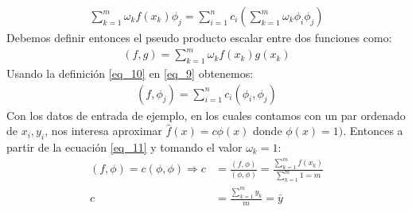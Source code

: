 \documentclass[10pt,a4paper]{article}
\numberwithin{equation}{section}
\numberwithin{figure}{section}
\numberwithin{table}{section}
\begin{document}
\begin{equation}\label{eq_9}
    \begin{split}
       \sum_{k=1}^m \omega_k f(x_k) \phi_j = \sum_{i=1}^n c_i ( \sum_{k=1}^m  \omega_k \phi_i \phi_j )
    \end{split}
\end{equation}
Debemos definir entonces el pseudo producto escalar entre dos funciones como:
\begin{equation}\label{eq_10}
    \begin{split}
        (f,g) = \sum_{k=1}^m \omega_k f(x_k) g(x_k)
    \end{split}
\end{equation}
Usando la definición \ref*{eq_10} en \ref*{eq_9} obtenemos:
\begin{equation}\label{eq_11}
    \begin{split}
        (f,\phi_j) = \sum_{i=1}^n c_i (\phi_i,\phi_j)
    \end{split}
\end{equation}
Con los datos de entrada de ejemplo, en los cuales contamos con un par ordenado de ${x_i,y_i}$, nos interesa aproximar $\hat{f}(x) = c \phi(x)$ donde $\phi(x) = 1)$. Entonces a partir de la ecuación \ref*{eq_11}
y tomando el valor $\omega_k = 1$:
\begin{equation}
    \begin{split}
        (f,\phi) = c(\phi,\phi) \Longrightarrow c &= \frac{(f,\phi)}{(\phi,\phi)} = \frac{\sum\limits_{k=1}^m f(x_k)}{\sum\limits_{k=1}^m 1 = m} \\
        c &= \frac{\sum\limits_{k=1}^m y_k}{m} = \bar{y}
    \end{split}
\end{equation}
\end{document}
